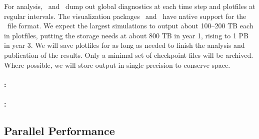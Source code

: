 For analysis, \maestro\ and \castro\ dump out global diagnostics at
each time step and plotfiles at regular intervals.  The visualization
packages \visit\ and \yt\ have native support for the \boxlib\ file
format.  We expect the largest simulations to output about 100--200 TB
each in plotfiles, putting the storage needs at about 800 TB in year
1, rising to 1 PB in year 3.  We will save plotfiles for as long as
needed to finish the analysis and publication of the results.  Only a
minimal set of checkpoint files will be archived.  Where possible, we
will store output in single precision to conserve space.

\paragraph{\flash: }

\paragraph{\chimera: }


\subsection{Parallel Performance}


